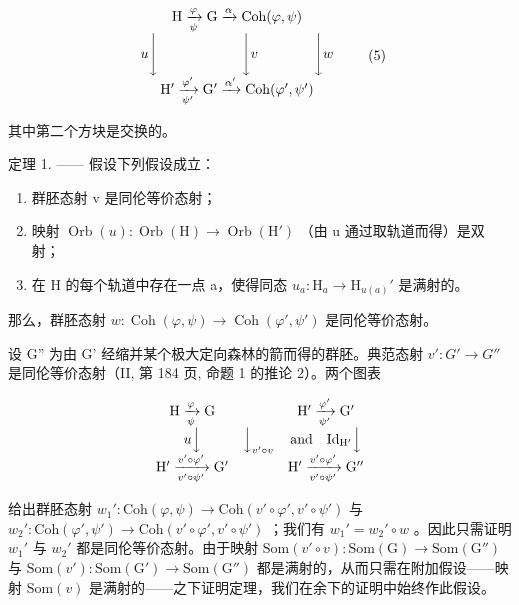 \[
\begin{array}{c} \mathrm{H} \xrightarrow [ \psi ]{\varphi} \mathrm{G} \xrightarrow {\alpha} \mathrm{Coh} (\varphi , \psi) \\ u \Biggl \downarrow \qquad \qquad \qquad \Biggl \downarrow v \qquad \qquad \Biggl \downarrow w \\ \mathrm{H} ^ {\prime} \xrightarrow [ \psi^ {\prime} ]{\varphi^ {\prime}} \mathrm{G} ^ {\prime} \xrightarrow {\alpha^ {\prime}} \mathrm{Coh} (\varphi^ {\prime}, \psi^ {\prime}) \end{array}\tag{5}
\]

其中第二个方块是交换的。

定理 1. —— 假设下列假设成立：

\begin{enumerate}
\def\labelenumi{(\roman{enumi})}
\item
  群胚态射 v 是同伦等价态射；
\item
  映射 \(\operatorname{Orb}(u)\colon\operatorname{Orb}(\mathrm{H})\to\operatorname{Orb}(\mathrm{H}')\) （由 u 通过取轨道而得）是双射；
\item
  在 H 的每个轨道中存在一点 a，使得同态 \(u_a \colon \mathrm{H}_a \to \mathrm{H}_{u(a)}'\) 是满射的。
\end{enumerate}

那么，群胚态射 \(w\colon \operatorname{Coh}(\varphi,\psi)\to\operatorname{Coh}(\varphi',\psi')\) 是同伦等价态射。

设 G'' 为由 G' 经缩并某个极大定向森林的箭而得的群胚。典范态射 \(v'\colon G' \to G''\) 是同伦等价态射（II, 第 184 页, 命题 1 的推论 2）。两个图表

\[
\begin{array}{c c c} \mathrm{H} \xrightarrow [ \psi ]{\varphi} \mathrm{G} & & \mathrm{H} ^ {\prime} \xrightarrow [ \psi^ {\prime} ]{\varphi^ {\prime}} \mathrm{G} ^ {\prime} \\ u \Big \downarrow & \Big \downarrow_ {v ^ {\prime} \circ v} & \text {and} \quad \mathrm{Id} _ {\mathrm{H} ^ {\prime}} \Big \downarrow \\ \mathrm{H} ^ {\prime} \xrightarrow [ v ^ {\prime} \circ \psi^ {\prime} ]{v ^ {\prime} \circ \varphi^ {\prime}} \mathrm{G} ^ {\prime} & & \mathrm{H} ^ {\prime} \xrightarrow [ v ^ {\prime} \circ \psi^ {\prime} ]{v ^ {\prime} \circ \varphi^ {\prime}} \mathrm{G} ^ {\prime \prime} \end{array}
\]

给出群胚态射 \(w_1' \colon \mathrm{Coh}(\varphi, \psi) \to \mathrm{Coh}(v' \circ \varphi', v' \circ \psi')\) 与 \(w_2' \colon \mathrm{Coh}(\varphi', \psi') \to \mathrm{Coh}(v' \circ \varphi', v' \circ \psi')\) ；我们有 \(w_1' = w_2' \circ w\) 。因此只需证明 \(w_1'\) 与 \(w_2'\) 都是同伦等价态射。由于映射 \(\mathrm{Som}(v' \circ v) \colon \mathrm{Som}(\mathrm{G}) \to \mathrm{Som}(\mathrm{G}'' )\) 与 \(\mathrm{Som}(v') \colon \mathrm{Som}(\mathrm{G}') \to \mathrm{Som}(\mathrm{G}'' )\) 都是满射的，从而只需在附加假设——映射 \(\mathrm{Som}(v)\) 是满射的——之下证明定理，我们在余下的证明中始终作此假设。

